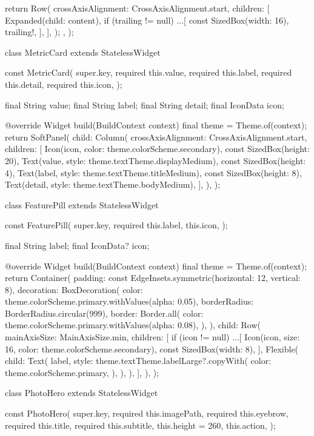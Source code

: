 \documentclass[11pt,a4paper]{article}
\begin{document}
\begin{codeblock}
{{{        return Row(
          crossAxisAlignment: CrossAxisAlignment.start,
          children: [
            Expanded(child: content),
            if (trailing != null) ...[
              const SizedBox(width: 16),
              trailing!,
            ],
          ],
        );
      },
    );
  }
}

class MetricCard extends StatelessWidget {
  const MetricCard({
    super.key,
    required this.value,
    required this.label,
    required this.detail,
    required this.icon,
  });

  final String value;
  final String label;
  final String detail;
  final IconData icon;

  @override
  Widget build(BuildContext context) {
    final theme = Theme.of(context);
    return SoftPanel(
      child: Column(
        crossAxisAlignment: CrossAxisAlignment.start,
        children: [
          Icon(icon, color: theme.colorScheme.secondary),
          const SizedBox(height: 20),
          Text(value, style: theme.textTheme.displayMedium),
          const SizedBox(height: 4),
          Text(label, style: theme.textTheme.titleMedium),
          const SizedBox(height: 8),
          Text(detail, style: theme.textTheme.bodyMedium),
        ],
      ),
    );
  }
}

class FeaturePill extends StatelessWidget {
  const FeaturePill({
    super.key,
    required this.label,
    this.icon,
  });

  final String label;
  final IconData? icon;

  @override
  Widget build(BuildContext context) {
    final theme = Theme.of(context);
    return Container(
      padding: const EdgeInsets.symmetric(horizontal: 12, vertical: 8),
      decoration: BoxDecoration(
        color: theme.colorScheme.primary.withValues(alpha: 0.05),
        borderRadius: BorderRadius.circular(999),
        border: Border.all(
          color: theme.colorScheme.primary.withValues(alpha: 0.08),
        ),
      ),
      child: Row(
        mainAxisSize: MainAxisSize.min,
        children: [
          if (icon != null) ...[
            Icon(icon, size: 16, color: theme.colorScheme.secondary),
            const SizedBox(width: 8),
          ],
          Flexible(
            child: Text(
              label,
              style: theme.textTheme.labelLarge?.copyWith(
                color: theme.colorScheme.primary,
              ),
            ),
          ),
        ],
      ),
    );
  }
}

class PhotoHero extends StatelessWidget {
  const PhotoHero({
    super.key,
    required this.imagePath,
    required this.eyebrow,
    required this.title,
    required this.subtitle,
    this.height = 260,
    this.action,
  });

}
\end{codeblock}
\end{document}
